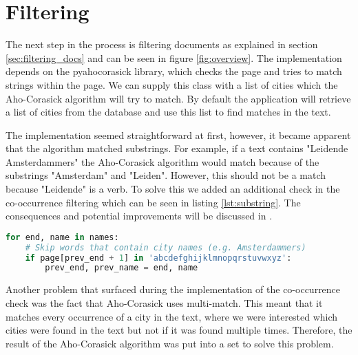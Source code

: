 \section{Filtering}\label{sec:5-filtering}
The next step in the process is filtering documents as explained in section \ref{sec:filtering_docs} and can be seen in figure \ref{fig:overview}. The implementation depends on the pyahocorasick library, which checks the page and tries to match strings within the page. We can supply this class with a list of cities which the Aho-Corasick algorithm will try to match. By default the application will retrieve a list of cities from the database and use this list to find matches in the text.

The implementation seemed straightforward at first, however, it became apparent that the algorithm matched substrings. For example, if a text contains "Leidende Amsterdammers" the Aho-Corasick algorithm would match because of the substrings "Amsterdam" and "Leiden". However, this should not be a match because "Leidende" is a verb. To solve this we added an additional check in the co-occurrence filtering which can be seen in listing \ref{lst:substring}. The consequences and potential improvements will be discussed in .

\begin{lstlisting}[language=Python, caption=Additional check to prevent substring matches, label={lst:substring}]
for end, name in names:
    # Skip words that contain city names (e.g. Amsterdammers)
    if page[prev_end + 1] in 'abcdefghijklmnopqrstuvwxyz':
        prev_end, prev_name = end, name
\end{lstlisting}

Another problem that surfaced during the implementation of the co-occurrence check was the fact that Aho-Corasick uses multi-match. This meant that it matches every occurrence of a city in the text, where we were interested which cities were found in the text but not if it was found multiple times. Therefore, the result of the Aho-Corasick algorithm was put into a set to solve this problem.
